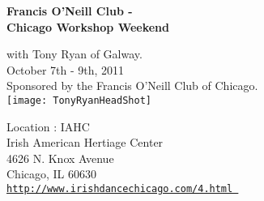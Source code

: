 \vspace{0pt}
\begin{center}
{\large\textbf{Francis O'Neill Club -\\ Chicago Workshop Weekend}}\\ 
\end{center}

with Tony Ryan of Galway.\\October 7th - 9th, 2011\\ Sponsored by the Francis O'Neill Club of Chicago.\\

\vspace*{0.5em}
\texttt{[image: TonyRyanHeadShot]}

\vspace*{0.5em}
Location : IAHC\\
Irish American Hertiage Center\\
4626 N. Knox Avenue\\
Chicago, IL  60630 \\

\href{http://www.irishdancechicago.com/4.html}{\tt http://www.irishdancechicago.com/4.html }
